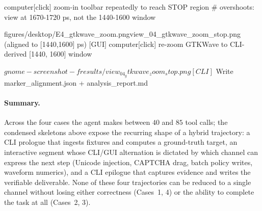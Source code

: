 \documentclass{llmxive}
\providecommand{\cliOswN}{362}
\providecommand{\cliOswIntent}{79.1}
\providecommand{\cuaVisionIntent}{77.3}
\providecommand{\cuaVisionNative}{64.3}
\providecommand{\cliOswSteps}{14.3}
\providecommand{\cuaVisionSteps}{29.0}
\begin{document}
\begin{guimode}
[GUI]  computer[click] zoom-in toolbar repeatedly to reach STOP region
       # overshoots: view at 1670-1720 ps, not the 1440-1600 window
\end{guimode}
\begin{trajactGUI}{figures/desktop/E4_gtkwave_zoom.png}{view\_04\_gtkwave\_zoom\_stop.png (aligned to [1440,1600] ps)}
[GUI]  computer[click] re-zoom GTKWave
       to CLI-derived [1440, 1600] window
\end{trajactGUI}
\begin{climode}
[CLI]  $ gnome-screenshot -f results/view_04_gtkwave_zoom_stop.png
[CLI]  $ Write marker_alignment.json + analysis_report.md
\end{climode}

\paragraph{Summary.}  Across the four cases the agent makes between $40$ and $85$ tool calls; the condensed skeletons above expose the recurring shape of a hybrid trajectory: a CLI prologue that ingests fixtures and computes a ground-truth target, an interactive segment whose CLI/GUI alternation is dictated by which channel can express the next step (Unicode injection, CAPTCHA drag, batch policy writes, waveform numerics), and a CLI epilogue that captures evidence and writes the verifiable deliverable. None of these four trajectories can be reduced to a single channel without losing either correctness (Cases~1, 4) or the ability to complete the task at all (Cases~2, 3).



\renewcommand{\cliOswN}{362}
\renewcommand{\cliOswIntent}{79.1}
\renewcommand{\cuaVisionIntent}{77.3}
\renewcommand{\cuaVisionNative}{64.3}
\renewcommand{\cliOswSteps}{14.3}
\renewcommand{\cuaVisionSteps}{29.0}
\end{document}

